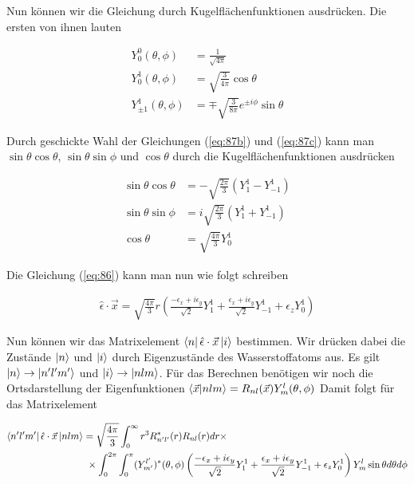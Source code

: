 Nun können wir die Gleichung durch Kugelflächenfunktionen ausdrücken. Die ersten von ihnen lauten

\begin{subequations}
\begin{align}
  Y^0_0(\theta,\phi) &= \frac{1}{\sqrt{4\pi}} \label{eq:87a} \\
  Y^1_0(\theta,\phi) &= \sqrt{\frac{3}{4\pi}}\cos\theta \label{eq:87b}\\
Y^1_{\pm 1}(\theta,\phi) &= \mp \sqrt{\frac{3}{8\pi}}e^{\pm i\phi}\sin\theta \label{eq:87c} 
\end{align}
\end{subequations}

Durch geschickte Wahl der Gleichungen (\ref{eq:87b}) und (\ref{eq:87c})  kann man \(\sin\theta\cos\theta\), \(\sin\theta\sin\phi\) und \(\cos\theta\) durch die Kugelflächenfunktionen ausdrücken

\begin{subequations}
  \begin{align}
    \sin\theta\cos\theta &= -\sqrt{\frac{2\pi}{3}}(Y^1_1 - Y^1_{-1}) \label{eq:88a}\\
    \sin\theta\sin\phi &= i \sqrt{\frac{2\pi}{3}}(Y^1_1 + Y^1_{-1})\label{eq:88b}\\
    \cos\theta &= \sqrt{\frac{4\pi}{3}}Y^1_0
  \end{align}
\end{subequations}

Die Gleichung (\ref{eq:86}) kann man nun wie folgt schreiben

\begin{align}
  \label{eq:88}
   \hat \epsilon \cdot \vec x = \sqrt{\frac{4\pi}{3}}  r \left(\frac{-\epsilon_x+i\epsilon_y}{\sqrt{2}}Y^1_1  + \frac{\epsilon_x+i\epsilon_y}{\sqrt{2}}Y^1_{-1} + \epsilon_z Y^1_0  \right)
\end{align}

Nun können wir das Matrixelement \(\left\langle n \right|\hat \epsilon \cdot \vec x\left| i \right\rangle\) bestimmen. Wir drücken dabei die Zustände \(\left| n \right\rangle\) und \(\left| i \right\rangle\) durch Eigenzustände des Wasserstoffatoms aus. Es gilt \(\left| n \right\rangle \rightarrow \left| n'l'm' \right\rangle\) und \(\left| i \right\rangle\rightarrow \left| nlm \right\rangle\). Für das Berechnen benötigen wir noch die Ortsdarstellung der Eigenfunktionen \(\braket{\vec x}{nlm} = R_{nl}(\vec x)Y^l_m(\theta,\phi)\) Damit folgt für das Matrixelement

\begin{align}
  \label{eq:87}
  \left\langle n'l'm' \right| \hat \epsilon \cdot \vec x \left| nlm \right\rangle &= \sqrt{\frac{4\pi}{3}}\int^\infty_0 r^3 R^*_{n'l'}(r) R_{nl}(r)dr  \times \notag\\
   &\,\,\times \int_0^{2\pi} \int_0^\pi (Y^{l'}_{m'})^*(\theta,\phi) \left(  \frac{-\epsilon_x+i\epsilon_y}{\sqrt{2}}Y^1_1  + \frac{\epsilon_x+i\epsilon_y}{\sqrt{2}}Y^1_{-1} + \epsilon_z Y^1_0   \right) Y^{l}_{m} \sin\theta d\theta d\phi
\end{align}

